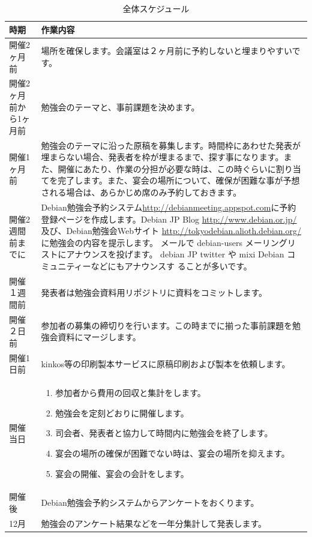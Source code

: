 \documentclass[mingoth,a4paper]{jsarticle}
\begin{document}
\begin{table}[ht]
\begin{center}
\small
\begin{tabular}{|p{12em}|p{31em}|}
\hline
時期&作業内容 \\
\hline\hline
開催2ヶ月前 & 場所を確保します。会議室は２ヶ月前に予約しないと埋まりやすいです。\\
\hline
開催2ヶ月前から1ヶ月前 & 勉強会のテーマと、事前課題を決めます。\\
\hline
開催1ヶ月前 & 勉強会のテーマに沿った原稿を募集します。時間枠にあわせた発表が埋まらない場合、発表者を枠が埋まるまで、探す事になります。また、開催にあたり、作業の分担が必要な時は、この時ぐらいに割り当てを完了します。また、宴会の場所について、確保が困難な事が予想される場合は、あらかじめ席のみ予約しておきます。\\
\hline
開催2週間前までに & Debian勉強会予約システム\url{http://debianmeeting.appspot.com}に予約登録ページを作成します。Debian JP Blog \url{http://www.debian.or.jp/}及び、Debian勉強会Webサイト \url{http://tokyodebian.alioth.debian.org/} に勉強会の内容を提示します。
     メールで debian-users メーリングリストにアナウンスを投げます。
     debian JP twitter や mixi Debian コミュニティーなどにもアナウンスす
     ることが多いです。\\
\hline
開催１週間前 & 発表者は勉強会資料用リポジトリに資料をコミットします。\\
\hline
開催２日前　& 参加者の募集の締切りを行います。この時までに揃った事前課題を勉強会資料にマージします。\\
\hline
開催1日前　& kinkos等の印刷製本サービスに原稿印刷および製本を依頼します。\\
\hline
開催当日　& \begin{enumerate}
  \item 参加者から費用の回収と集計をします。
  \item 勉強会を定刻どおりに開催します。
  \item 司会者、発表者と協力して時間内に勉強会を終了します。
　　\item 宴会の場所の確保が困難でない時は、宴会の場所を抑えます。
  \item 宴会の開催、宴会の会計をします。
\end{enumerate} \\
\hline
開催後　& Debian勉強会予約システムからアンケートをおくります。 \\
\hline
12月　& 勉強会のアンケート結果などを一年分集計して発表します。 \\
\hline
\end{tabular}
\caption{全体スケジュール}
\label{tab:meeting-schedule}
\end{center}
\end{table}
\end{document}
